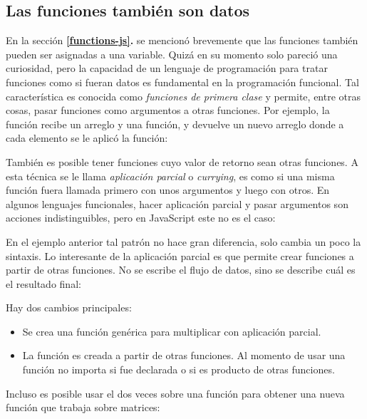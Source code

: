 \documentclass{article}
\newcommand{\codejs}[1]{\tcbox{\lstinline[style=ES6]{#1}}}
\newcommand{\jsfile}[2]{}
\begin{document}
\subsection{Las funciones también son datos}
En la sección \textbf{\ref{functions-js}. } se mencionó brevemente que las funciones también pueden ser asignadas a una variable. Quizá en su momento solo pareció una curiosidad, pero la capacidad de un lenguaje de programación para tratar funciones como si fueran datos es fundamental en la programación funcional. Tal característica es conocida como \textit{funciones de primera clase} y permite, entre otras cosas, pasar funciones como argumentos a otras funciones. Por ejemplo, la función \codejs{map} recibe un arreglo y una función, y devuelve un nuevo arreglo donde a cada elemento se le aplicó la función:
\jsfile{Función map}{code/fp/imperative-map.js}

También es posible tener funciones cuyo valor de retorno sean otras funciones. A esta técnica se le llama \textit{aplicación parcial} o \textit{currying}, es como si una misma función fuera llamada primero con unos argumentos y luego con otros. En algunos lenguajes funcionales, hacer aplicación parcial y pasar argumentos son acciones indistinguibles, pero en JavaScript este no es el caso:
\jsfile{Función map con aplicación parcial}{code/fp/curried-map.js}

En el ejemplo anterior tal patrón no hace gran diferencia, solo cambia un poco la sintaxis. Lo interesante de la aplicación parcial es que permite crear funciones a partir de otras funciones. No se escribe el flujo de datos, sino se describe cuál es el resultado final:
\jsfile{Mapear una función que procesa elementos a una que procesa arreglos}{code/fp/double-array.js}

Hay dos cambios principales:
\begin{itemize}
  \item Se crea una función genérica para multiplicar con aplicación parcial.
  \item La función \codejs{double_array} es creada a partir de otras funciones. Al momento de usar una función no importa si fue declarada o si es producto de otras funciones.
\end{itemize}

Incluso es posible usar el \codejs{map} dos veces sobre una función para obtener una nueva función que trabaja sobre matrices:
\jsfile{Mapear una función que procesa elementos a una que procesa matrices}{code/fp/map-matrix.js}
\end{document}
